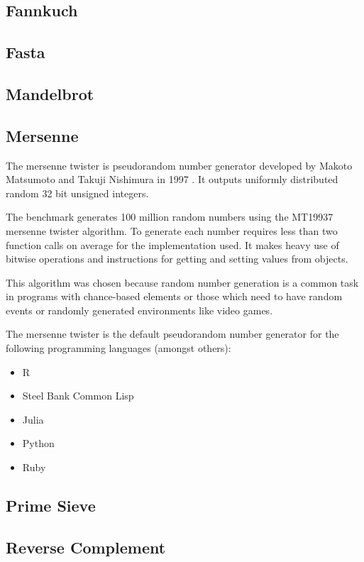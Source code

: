\documentclass[english,a4paper]{report}
\begin{document}
\subsection{Fannkuch}
\subsection{Fasta}
\subsection{Mandelbrot}

\subsection{Mersenne}
The mersenne twister is pseudorandom number generator developed by Makoto Matsumoto and Takuji Nishimura in 1997 \cite{Matsumoto}. It outputs uniformly distributed random 32 bit unsigned integers.

The benchmark generates 100 million random numbers using the MT19937 mersenne twister algorithm. To generate each number requires less than two function calls on average for the implementation used. It makes heavy use of bitwise operations and instructions for getting and setting values from objects.

This algorithm was chosen because random number generation is a common task in programs with chance-based elements or those which need to have random events or randomly generated environments like video games. 

The mersenne twister is the default pseudorandom number generator for the following programming languages (amongst others):
\begin{itemize}
	\item R \cite{R}
	\item Steel Bank Common Lisp \cite{SBCL}
	\item Julia \cite{Julia}
	\item Python \cite{Python}
	\item Ruby \cite{Ruby}
\end{itemize}


\subsection{Prime Sieve}
\subsection{Reverse Complement}
\end{document}
